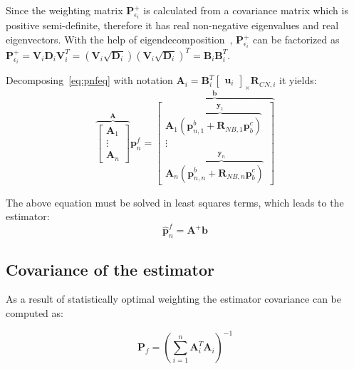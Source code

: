 Since the weighting matrix $\mathbf{P}_{\epsilon_i}^{+}$ is calculated from a covariance matrix which is positive semi-definite, therefore it has real non-negative eigenvalues and real eigenvectors. With the help of eigendecomposition~\cite{matrixtheory}, $\mathbf{P}_{\epsilon_i}^{+}$ can be factorized as $\mathbf{P}_{\epsilon_i}^{+}=\mathbf{V}_i\mathbf{D}_i\mathbf{V}_i^T = (\mathbf{V}_i\sqrt{\mathbf{D}_i}){(\mathbf{V}_i\sqrt{\mathbf{D}_i})}^T = \mathbf{B}_i\mathbf{B}_i^T$.

Decomposing~\eqref{eq:pnfeq} with notation $\mathbf{A}_i=\mathbf{B}_i^T\begin{bmatrix} \mathbf{u}_i \end{bmatrix}_\times\mathbf{R}_{CN, i}$ it yields:
\begin{equation}
    \overbrace{
    \begin{bmatrix}
        \mathbf{A}_1 \\ \vdots \\ \mathbf{A}_n
    \end{bmatrix}
    }^{\mathbf{A}} \mathbf{p}_n^f =
    \overbrace{
    \begin{bmatrix}
        \mathbf{A}_1\overbrace{(\mathbf{p}_{n, 1}^b+\mathbf{R}_{NB, 1}\mathbf{p}_b^c)}^{\mathbf{y}_1} \\ \vdots \\ \mathbf{A}_n\overbrace{(\mathbf{p}_{n, n}^b+\mathbf{R}_{NB, n}\mathbf{p}_b^c)}^{\mathbf{y}_n}
    \end{bmatrix}
    }^{\mathbf{b}}
    \label{eq:decomposed-linsys}
\end{equation}

The above equation must be solved in least squares terms, which leads to the estimator:
\begin{equation}
    \hat{\mathbf{p}}_n^f = \mathbf{A}^+\mathbf{b}
    \label{eq:estimator}
\end{equation}

\subsection{Covariance of the estimator}

As a result of statistically optimal weighting the estimator covariance can be computed as:

\begin{equation}
    \mathbf{P}_{f} = {\left(\sum_{i=1}^n \mathbf{A}_i^T\mathbf{A}_i\right)}^{-1}
    \label{eq:covest}
\end{equation}


